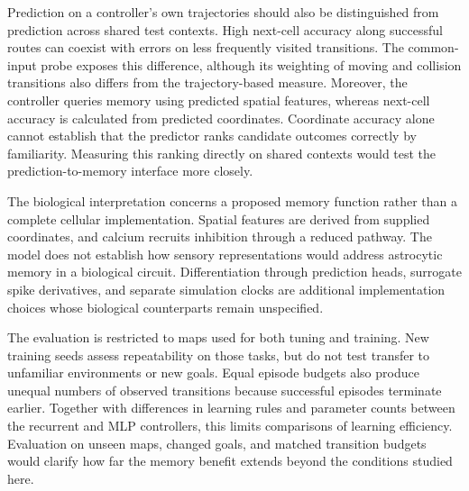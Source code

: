 Prediction on a controller's own trajectories should also be distinguished from prediction across shared test contexts. High next-cell accuracy along successful routes can coexist with errors on less frequently visited transitions. The common-input probe exposes this difference, although its weighting of moving and collision transitions also differs from the trajectory-based measure. Moreover, the controller queries memory using predicted spatial features, whereas next-cell accuracy is calculated from predicted coordinates. Coordinate accuracy alone cannot establish that the predictor ranks candidate outcomes correctly by familiarity. Measuring this ranking directly on shared contexts would test the prediction-to-memory interface more closely.

The biological interpretation concerns a proposed memory function rather than a complete cellular implementation. Spatial features are derived from supplied coordinates, and calcium recruits inhibition through a reduced pathway. The model does not establish how sensory representations would address astrocytic memory in a biological circuit. Differentiation through prediction heads, surrogate spike derivatives, and separate simulation clocks are additional implementation choices whose biological counterparts remain unspecified.

The evaluation is restricted to maps used for both tuning and training. New training seeds assess repeatability on those tasks, but do not test transfer to unfamiliar environments or new goals. Equal episode budgets also produce unequal numbers of observed transitions because successful episodes terminate earlier. Together with differences in learning rules and parameter counts between the recurrent and MLP controllers, this limits comparisons of learning efficiency. Evaluation on unseen maps, changed goals, and matched transition budgets would clarify how far the memory benefit extends beyond the conditions studied here.